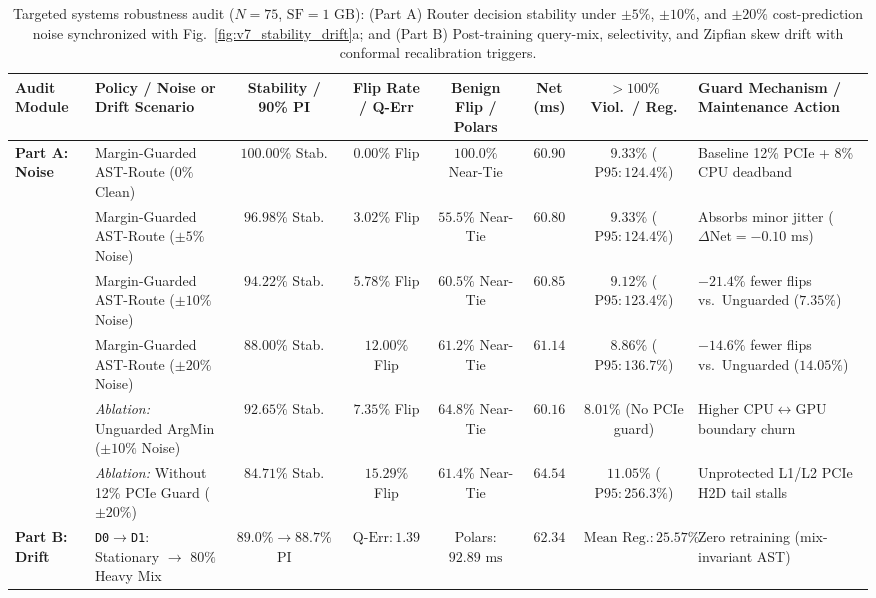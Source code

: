 \documentclass[10pt,a4paper]{article}
\newenvironment{fitasttable}{%
  \begin{lrbox}{\asttblbox}%
}{%
  \end{lrbox}%
  \sbox{\asttblboxB}{%
    \ifdim\wd\asttblbox>0.96\textwidth
      \resizebox{0.96\textwidth}{!}{\usebox{\asttblbox}}%
    \else
      \usebox{\asttblbox}%
    \fi
  }%
  \ifdim\ht\asttblboxB>0.72\textheight
    \resizebox{!}{0.72\textheight}{\usebox{\asttblboxB}}%
  \else
    \usebox{\asttblboxB}%
  \fi
}
\begin{document}
\begin{table}[!htbp]
\centering
\caption{Targeted systems robustness audit ($N=75$, $\text{SF}=1\text{ GB}$): (Part A) Router decision stability under $\pm 5\%$, $\pm 10\%$, and $\pm 20\%$ cost-prediction noise synchronized with Fig.~\ref{fig:v7_stability_drift}a; and (Part B) Post-training query-mix, selectivity, and Zipfian skew drift with conformal recalibration triggers.}\label{tab:v7_stability_drift}\label{tab:jbd_stability_t16}
\setlength{\tabcolsep}{2.8pt}
\scriptsize
\begin{fitasttable}
\begin{tabular}{@{}llcccccl@{}}
\toprule
\textbf{Audit Module} & \textbf{Policy / Noise or Drift Scenario} & \textbf{Stability / 90\% PI} & \textbf{Flip Rate / Q-Err} & \textbf{Benign Flip / Polars} & \textbf{Net (ms)} & \textbf{$>100\%$ Viol.\ / Reg.} & \textbf{Guard Mechanism / Maintenance Action} \\
\midrule
\multirow{6}{*}{\textbf{Part A: Noise}}
 & Margin-Guarded AST-Route ($0\%$ Clean) & $100.00\%$ Stab. & $0.00\%$ Flip & $100.0\%$ Near-Tie & $60.90$ & $9.33\%$ ($\text{P95}: 124.4\%$) & Baseline 12\% PCIe + 8\% CPU deadband \\
 & Margin-Guarded AST-Route ($\pm 5\%$ Noise) & $96.98\%$ Stab. & $3.02\%$ Flip & $55.5\%$ Near-Tie & $60.80$ & $9.33\%$ ($\text{P95}: 124.4\%$) & Absorbs minor jitter ($\Delta\text{Net} = -0.10\text{ ms}$) \\
 & Margin-Guarded AST-Route ($\pm 10\%$ Noise) & $\mathbf{94.22\%}$ Stab. & $\mathbf{5.78\%}$ Flip & $60.5\%$ Near-Tie & $60.85$ & $9.12\%$ ($\text{P95}: 123.4\%$) & $\mathbf{-21.4\%}$ fewer flips vs.\ Unguarded ($7.35\%$) \\
 & Margin-Guarded AST-Route ($\pm 20\%$ Noise) & $\mathbf{88.00\%}$ Stab. & $\mathbf{12.00\%}$ Flip & $61.2\%$ Near-Tie & $61.14$ & $\mathbf{8.86\%}$ ($\text{P95}: 136.7\%$) & $\mathbf{-14.6\%}$ fewer flips vs.\ Unguarded ($14.05\%$) \\
 & \emph{Ablation:} Unguarded ArgMin ($\pm 10\%$ Noise) & $92.65\%$ Stab. & $7.35\%$ Flip & $64.8\%$ Near-Tie & $60.16$ & $8.01\%$ (No PCIe guard) & Higher CPU$\leftrightarrow$GPU boundary churn \\
 & \emph{Ablation:} Without 12\% PCIe Guard ($\pm 20\%$) & $84.71\%$ Stab. & $15.29\%$ Flip & $61.4\%$ Near-Tie & $64.54$ & $11.05\%$ ($\text{P95}: 256.3\%$) & Unprotected L1/L2 PCIe H2D tail stalls \\
\midrule
\multirow{5}{*}{\textbf{Part B: Drift}}
 & \texttt{D0$\rightarrow$D1}: Stationary $\rightarrow$ $80\%$ Heavy Mix & $89.0\% \rightarrow 88.7\%$ PI & $\text{Q-Err}: 1.39$ & Polars: $92.89\text{ ms}$ & $\mathbf{62.34}$ & $\text{Mean Reg.}: 25.57\%$ & Zero retraining (mix-invariant AST) \\

\end{tabular}
\end{fitasttable}
\end{table}
\end{document}
